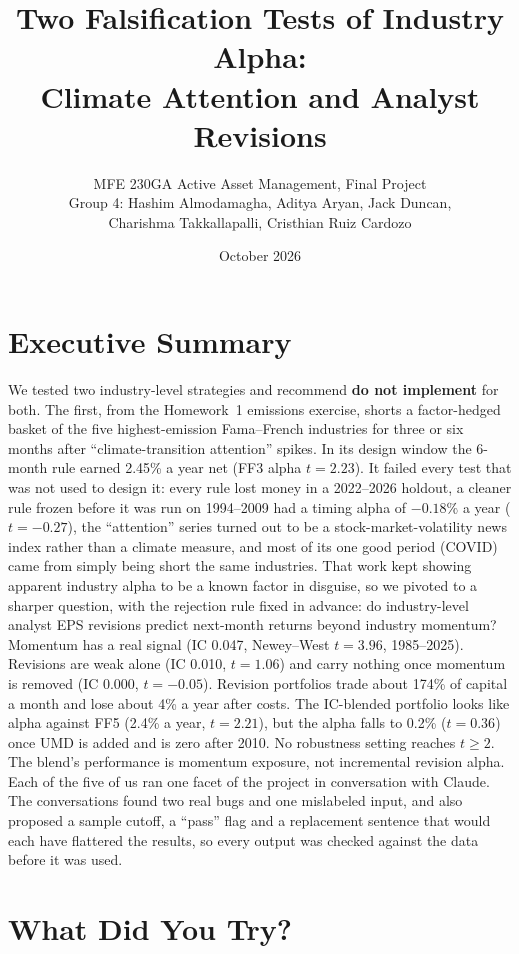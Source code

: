 \documentclass[11pt]{article}
\title{\vspace{-1.8em}\textbf{Two Falsification Tests of Industry Alpha:\\ Climate Attention and Analyst Revisions}}
\author{\small MFE 230GA Active Asset Management, Final Project\\
\small Group 4: Hashim Almodamagha, Aditya Aryan, Jack Duncan,\\ \small Charishma Takkallapalli, Cristhian Ruiz Cardozo}
\date{\small October 2026}
\begin{document}
\maketitle
\vspace{-1.6em}

\section*{Executive Summary}

We tested two industry-level strategies and recommend \textbf{do not implement} for both. The first, from the Homework~1 emissions exercise, shorts a factor-hedged basket of the five highest-emission Fama--French industries for three or six months after ``climate-transition attention'' spikes. In its design window the 6-month rule earned 2.45\% a year net (FF3 alpha $t=2.23$). It failed every test that was not used to design it: every rule lost money in a 2022--2026 holdout, a cleaner rule frozen before it was run on 1994--2009 had a timing alpha of $-0.18\%$ a year ($t=-0.27$), the ``attention'' series turned out to be a stock-market-volatility news index rather than a climate measure, and most of its one good period (COVID) came from simply being short the same industries. That work kept showing apparent industry alpha to be a known factor in disguise, so we pivoted to a sharper question, with the rejection rule fixed in advance: do industry-level analyst EPS revisions predict next-month returns beyond industry momentum? Momentum has a real signal (IC 0.047, Newey--West $t=3.96$, 1985--2025). Revisions are weak alone (IC 0.010, $t=1.06$) and carry nothing once momentum is removed (IC 0.000, $t=-0.05$). Revision portfolios trade about 174\% of capital a month and lose about 4\% a year after costs. The IC-blended portfolio looks like alpha against FF5 (2.4\% a year, $t=2.21$), but the alpha falls to 0.2\% ($t=0.36$) once UMD is added and is zero after 2010. No robustness setting reaches $t\geq 2$. The blend's performance is momentum exposure, not incremental revision alpha. Each of the five of us ran one facet of the project in conversation with Claude. The conversations found two real bugs and one mislabeled input, and also proposed a sample cutoff, a ``pass'' flag and a replacement sentence that would each have flattered the results, so every output was checked against the data before it was used.

\section{What Did You Try?}
\label{sec:try}
\end{document}
